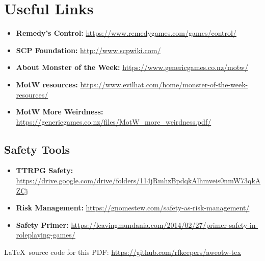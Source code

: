 \documentclass[10pt,oneside,landscape]{memoir}
\begin{document}

\pagebreak


\pagebreak


\pagebreak


\pagebreak


\pagebreak

\fontsize{12}{14}\selectfont
\chapter*{Useful Links}
\begin{itemize}

\item \textbf{Remedy’s Control:} \url{https://www.remedygames.com/games/control/}
\item \textbf{SCP Foundation:} \url{http://www.scpwiki.com/}
\item \textbf{About Monster of the Week:} \url{https://www.genericgames.co.nz/motw/}
\item \textbf{MotW resources:} \url{https://www.evilhat.com/home/monster-of-the-week-resources/}
\item \textbf{MotW More Weirdness:} \url{https://genericgames.co.nz/files/MotW_more_weirdness.pdf/}

\end{itemize}
%
\brln
%
\section*{Safety Tools}
\begin{itemize}

\item \textbf{TTRPG Safety:} \url{https://drive.google.com/drive/folders/114jRmhzBpdqkAlhmveis0nmW73qkAZCj}
\item \textbf{Risk Management:} \url{https://gnomestew.com/safety-as-risk-management/}
\item \textbf{Safety Primer:} \url{https://leavingmundania.com/2014/02/27/primer-safety-in-roleplaying-games/}    

\end{itemize}
%
\br[6mm]
%
\LaTeX \ source code for this PDF: \url{https://github.com/rfkeepers/aweotw-tex}
\pagebreak
\end{document}

